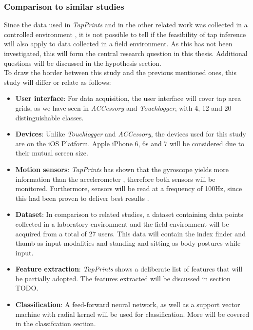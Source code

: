 \subsubsection{Comparison to similar studies}

Since the data used in \textit{TapPrints} and in the other related work was collected in a controlled environment \cite{Accessory,Touchlogger,Tapprints}, it is not possible to tell if the feasibility of tap inference will also apply to data collected in a field environment. As this has not been investigated, this will form the central research question in this thesis. Additional questions will be discussed in the hypothesis section.\\ %

To draw the border between this study and the previous mentioned ones, this study will differ or relate as follows:
\begin{itemize}
  \item \textbf{User interface}: For data acquisition, the user interface will cover tap area grids, as we have seen in \textit{ACCessory} and \textit{Touchlogger}, with 4, 12 and 20 distinguishable classes.
  \item \textbf{Devices}: Unlike \textit{Touchlogger} and \textit{ACCessory}, the devices used for this study are on the iOS Platform. Apple iPhone 6, 6s and 7 will be considered due to their mutual screen size.
  \item \textbf{Motion sensors}: \textit{TapPrints} has shown that the gyroscope yields more information than the accelerometer \cite{Tapprints}, therefore both sensors will be monitored. Furthermore, sensors will be read at a frequency of 100Hz, since this had been proven to deliver best results \cite{Tapprints, Accessory}.
  \item \textbf{Dataset}: In comparison to related studies, a dataset containing data points collected in a laboratory environment and the field environment will be acquired from a total of 27 users. This data will contain the index finder and thumb as input modalities and standing and sitting as body postures while input. 
  \item \textbf{Feature extraction}: \textit{TapPrints} shows a deliberate list of features \cite{Tapprints} that will be partially adopted. The features extracted will be discussed in section TODO.
  \item \textbf{Classification}: A feed-forward neural network, as well as a support vector machine with radial kernel will be used for classification. More will be covered in the classifcation section.
\end{itemize}

